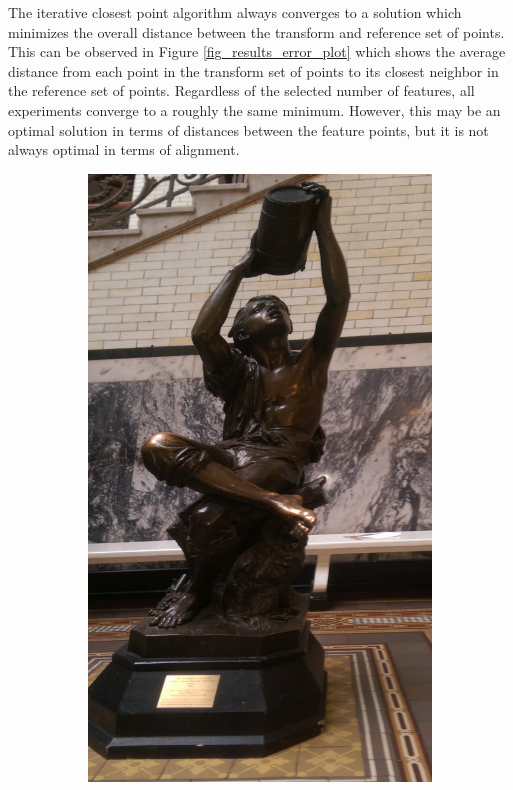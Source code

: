 \documentclass[sigconf]{acmart/acmart}
\begin{document}
The iterative closest point algorithm always converges to a solution which minimizes the overall distance between the transform and reference set of points. This can be observed in Figure \ref{fig_results_error_plot} which shows the average distance from each point in the transform set of points to its closest neighbor in the reference set of points. Regardless of the selected number of features, all experiments converge to a roughly the same minimum. However, this may be an optimal solution in terms of distances between the feature points, but it is not always optimal in terms of alignment. 

\begin{figure}
	\centering
	\begin{subfigure}[b]{0.3\textwidth}
		\centering
		\includegraphics[width=\textwidth]{figures/alignment/waterboy_left}

\end{subfigure}
\end{figure}
\end{document}
